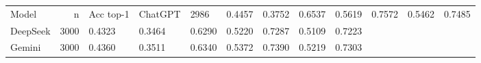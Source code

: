 \begin{tabular}{lrlllllll}
\toprule
Model & n & Acc top-1 & %
\midrule
ChatGPT & 2986 & 0.4457 & 0.3752 & 0.6537 & 0.5619 & 0.7572 & 0.5462 & 0.7485 \\
DeepSeek & 3000 & 0.4323 & 0.3464 & 0.6290 & 0.5220 & 0.7287 & 0.5109 & 0.7223 \\
Gemini & 3000 & 0.4360 & 0.3511 & 0.6340 & 0.5372 & 0.7390 & 0.5219 & 0.7303 \\
\bottomrule
\end{tabular}
